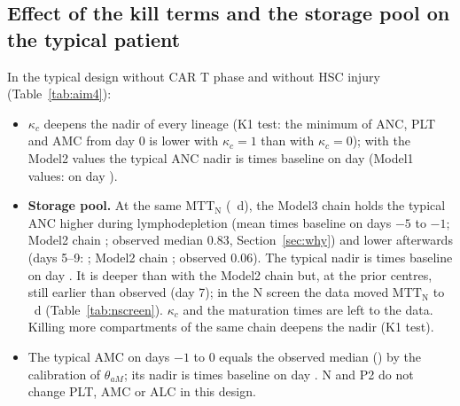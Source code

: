 \documentclass[11pt]{article}
\begin{document}
\subsection{Effect of the kill terms and the storage pool on the typical patient}\label{sec:kill}
In the typical design without CAR T phase and without HSC injury (Table~\ref{tab:aim4}):
\begin{itemize}
\item $\kappa_c$ deepens the nadir of every lineage (K1 test: the minimum of ANC, PLT and AMC from day 0 is lower with $\kappa_c=1$ than with $\kappa_c=0$); with the Model2 values the typical ANC nadir is \valAncNadirModelTwo{} times baseline on day \valAncNadirDayModelTwo{} (Model1 values: \valAncNadirModelOne{} on day \valAncNadirDayModelOne).
\item \textbf{Storage pool.} At the same $\mathrm{MTT}_{\mathrm{N}}$ (\valMttN~d), the Model3 chain holds the typical ANC higher during lymphodepletion (mean \valAncPreModel{} times baseline on days $-5$ to $-1$; Model2 chain \valAncPreModelTwo; observed median 0.83, Section~\ref{sec:why}) and lower afterwards (days 5--9: \valAncMidModel; Model2 chain \valAncMidModelTwo; observed 0.06). The typical nadir is \valAncNadirModel{} times baseline on day \valAncNadirDayModel. It is deeper than with the Model2 chain but, at the prior centres, still earlier than observed (day 7); in the N screen the data moved $\mathrm{MTT}_{\mathrm{N}}$ to \valNScreenMtt~d (Table~\ref{tab:nscreen}). $\kappa_c$ and the maturation times are left to the data. Killing more compartments of the same chain deepens the nadir (K1 test).
\item The typical AMC on days $-1$ to 0 equals the observed median (\valAmcTarget) by the calibration of $\theta_{aM}$; its nadir is \valAmcNadirModel{} times baseline on day \valAmcNadirDayModel. N and P2 do not change PLT, AMC or ALC in this design.
\end{itemize}
\end{document}
